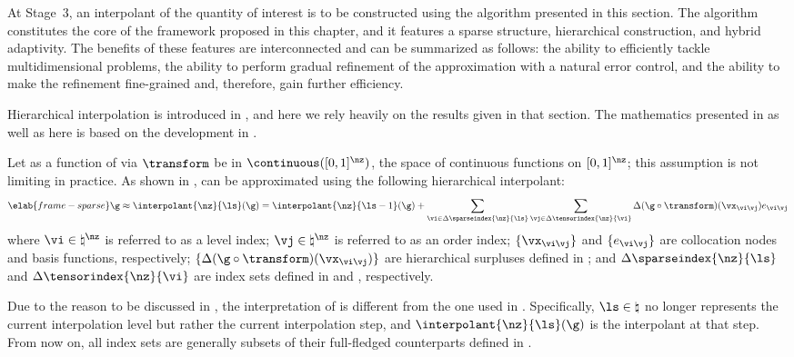 At Stage~3, an interpolant of the quantity of interest is to be constructed
using the algorithm presented in this section. The algorithm constitutes the
core of the framework proposed in this chapter, and it features a sparse
structure, hierarchical construction, and hybrid adaptivity. The benefits of
these features are interconnected and can be summarized as follows: the ability
to efficiently tackle multidimensional problems, the ability to perform gradual
refinement of the approximation with a natural error control, and the ability to
make the refinement fine-grained and, therefore, gain further efficiency.

Hierarchical interpolation is introduced in , and
here we rely heavily on the results given in that section. The mathematics
presented in  as well as here is based on the
development in \cite{klimke2006, ma2009, jakeman2012}.

Let \g as a function of \vz via $\transform$ be in $\continuous([0, 1]^\nz)$,
the space of continuous functions on $[0, 1]^\nz$; this assumption is not
limiting in practice. As shown in , \g can be
approximated using the following hierarchical interpolant:
\begin{equation} \elab{frame-sparse}
  \g \approx \interpolant{\nz}{\ls}(\g)
  = \interpolant{\nz}{\ls - 1}(\g) + \sum_{\vi \in \Delta\sparseindex{\nz}{\ls}}
  \sum_{\vj \in \Delta\tensorindex{\nz}{\vi}} \Delta(\g \circ \transform)(\vx_{\vi \vj}) e_{\vi \vj} \end{equation}
where $\vi \in \natural^\nz$ is referred to as a level index; $\vj \in
\natural^\nz$ is referred to as an order index; $\{ \vx_{\vi \vj} \}$ and $\{
e_{\vi \vj} \}$ are collocation nodes and basis functions, respectively; $\{
\Delta(\g \circ \transform)(\vx_{\vi \vj}) \}$ are hierarchical surpluses
defined in ; and $\Delta\sparseindex{\nz}{\ls}$
and $\Delta\tensorindex{\nz}{\vi}$ are index sets defined in
 and ,
respectively.

Due to the reason to be discussed in , the interpretation
of  is different from the one used in
. Specifically, $\ls \in \natural$ no longer
represents the current interpolation level but rather the current interpolation
step, and $\interpolant{\nz}{\ls}(\g)$ is the interpolant at that step. From now
on, all index sets are generally subsets of their full-fledged counterparts
defined in .

